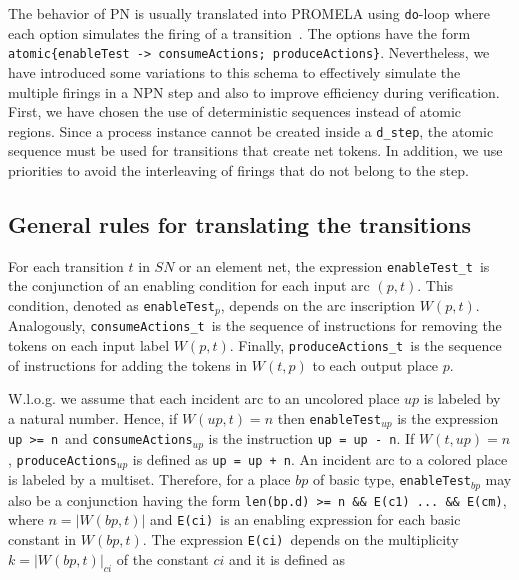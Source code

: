 \documentclass{llncs}
\begin{document}
The behavior of PN is usually translated into PROMELA using \small\verb"do"\nfont-loop where each option simulates the firing of a transition~\cite{spin}. The options have the form\\  \small\verb"atomic{enableTest -> consumeActions; produceActions}"\nfont. Nevertheless, we have introduced some variations to this schema to effectively simulate the multiple firings in a NPN step and also to improve efficiency during verification. First, we have chosen the use of deterministic sequences instead of atomic regions. Since a process instance cannot be created inside a \small\verb"d_step"\nfont, the atomic sequence must be used for transitions that create net tokens. In addition, we use priorities to avoid the interleaving of firings that do not belong to the step.


\subsection{General rules for translating the transitions}

For each transition $t$ in $SN$ or an element net, the expression \small\verb"enableTest_t"\nfont\  is the conjunction of an enabling condition for each input arc $(p,t)$. This condition, denoted as \small\verb"enableTest"\nfont$_p$, depends on the arc inscription $W(p,t)$. Analogously, \small\verb"consumeActions_t"\nfont\ is the sequence of instructions for removing the tokens on each input label $W(p,t)$. Finally, \small\verb"produceActions_t"\nfont\ is the sequence of instructions for adding the tokens in $W(t,p)$ to each output place $p$.


W.l.o.g. we assume that each incident arc to an uncolored place $up$ is labeled by a natural number. Hence, if $W(up,t) = n$ then \small\verb"enableTest"\nfont$_{up}$ is the expression \small\verb"up >= n"\nfont\ and \small\verb"consumeActions"\nfont$_{up}$ is the instruction \small\verb"up = up - n"\nfont. If $W(t, up) = n$, \small\verb"produceActions"\nfont$_{up}$ is defined as \small\verb"up = up + n"\nfont. An incident arc to a colored place is labeled by a multiset. Therefore, for a place $bp$ of basic type, \small\verb"enableTest"\nfont$_{bp}$ may also be a conjunction having the form \small\verb"len(bp.d) >= n && E(c1) ... && E(cm)"\nfont, where  $n=|W(bp,t)|$ and  \small\verb"E(ci)"\nfont\  is an enabling expression for each basic constant in $W(bp,t)$. The expression \small\verb"E(ci)"\nfont\  depends on the multiplicity $k=|W(bp,t)|_{ci}$ of the constant $ci$ and it is defined as
\end{document}
